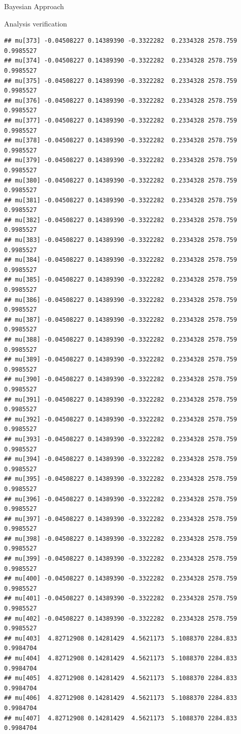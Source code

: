 \documentclass[
  ignorenonframetext,
]{beamer}
\begin{document}
\begin{frame}[fragile]{Bayesian Approach}
\begin{block}{Analysis verification}
\begin{verbatim}
## mu[373] -0.04508227 0.14389390 -0.3322282  0.2334328 2578.759 0.9985527
## mu[374] -0.04508227 0.14389390 -0.3322282  0.2334328 2578.759 0.9985527
## mu[375] -0.04508227 0.14389390 -0.3322282  0.2334328 2578.759 0.9985527
## mu[376] -0.04508227 0.14389390 -0.3322282  0.2334328 2578.759 0.9985527
## mu[377] -0.04508227 0.14389390 -0.3322282  0.2334328 2578.759 0.9985527
## mu[378] -0.04508227 0.14389390 -0.3322282  0.2334328 2578.759 0.9985527
## mu[379] -0.04508227 0.14389390 -0.3322282  0.2334328 2578.759 0.9985527
## mu[380] -0.04508227 0.14389390 -0.3322282  0.2334328 2578.759 0.9985527
## mu[381] -0.04508227 0.14389390 -0.3322282  0.2334328 2578.759 0.9985527
## mu[382] -0.04508227 0.14389390 -0.3322282  0.2334328 2578.759 0.9985527
## mu[383] -0.04508227 0.14389390 -0.3322282  0.2334328 2578.759 0.9985527
## mu[384] -0.04508227 0.14389390 -0.3322282  0.2334328 2578.759 0.9985527
## mu[385] -0.04508227 0.14389390 -0.3322282  0.2334328 2578.759 0.9985527
## mu[386] -0.04508227 0.14389390 -0.3322282  0.2334328 2578.759 0.9985527
## mu[387] -0.04508227 0.14389390 -0.3322282  0.2334328 2578.759 0.9985527
## mu[388] -0.04508227 0.14389390 -0.3322282  0.2334328 2578.759 0.9985527
## mu[389] -0.04508227 0.14389390 -0.3322282  0.2334328 2578.759 0.9985527
## mu[390] -0.04508227 0.14389390 -0.3322282  0.2334328 2578.759 0.9985527
## mu[391] -0.04508227 0.14389390 -0.3322282  0.2334328 2578.759 0.9985527
## mu[392] -0.04508227 0.14389390 -0.3322282  0.2334328 2578.759 0.9985527
## mu[393] -0.04508227 0.14389390 -0.3322282  0.2334328 2578.759 0.9985527
## mu[394] -0.04508227 0.14389390 -0.3322282  0.2334328 2578.759 0.9985527
## mu[395] -0.04508227 0.14389390 -0.3322282  0.2334328 2578.759 0.9985527
## mu[396] -0.04508227 0.14389390 -0.3322282  0.2334328 2578.759 0.9985527
## mu[397] -0.04508227 0.14389390 -0.3322282  0.2334328 2578.759 0.9985527
## mu[398] -0.04508227 0.14389390 -0.3322282  0.2334328 2578.759 0.9985527
## mu[399] -0.04508227 0.14389390 -0.3322282  0.2334328 2578.759 0.9985527
## mu[400] -0.04508227 0.14389390 -0.3322282  0.2334328 2578.759 0.9985527
## mu[401] -0.04508227 0.14389390 -0.3322282  0.2334328 2578.759 0.9985527
## mu[402] -0.04508227 0.14389390 -0.3322282  0.2334328 2578.759 0.9985527
## mu[403]  4.82712908 0.14281429  4.5621173  5.1088370 2284.833 0.9984704
## mu[404]  4.82712908 0.14281429  4.5621173  5.1088370 2284.833 0.9984704
## mu[405]  4.82712908 0.14281429  4.5621173  5.1088370 2284.833 0.9984704
## mu[406]  4.82712908 0.14281429  4.5621173  5.1088370 2284.833 0.9984704
## mu[407]  4.82712908 0.14281429  4.5621173  5.1088370 2284.833 0.9984704

\end{verbatim}
\end{block}
\end{frame}
\end{document}
